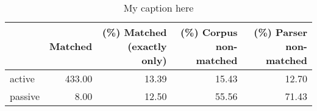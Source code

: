 \begin{table}[!ht]
\centering
\begin{tabular}{lrrrr}
\toprule
{} &  Matched &  (\%) Matched (exactly only) &  (\%) Corpus non-matched &  (\%) Parser non-matched \\
\midrule
active  &   433.00 &                       13.39 &                   15.43 &                   12.70 \\
passive &     8.00 &                       12.50 &                   55.56 &                   71.43 \\
\bottomrule
\end{tabular}
\caption{My caption here}
\label{tab:VOICE-ocd-relative}
\end{table}